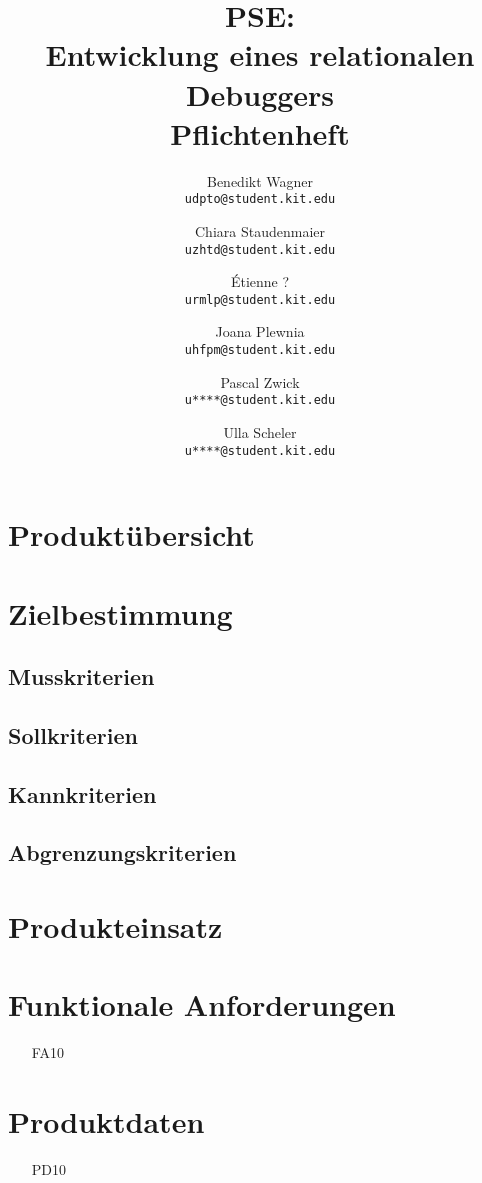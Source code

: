 \documentclass[parskip=full]{scrartcl}
\title{PSE:\\ Entwicklung eines relationalen Debuggers\\ Pflichtenheft}
\author{
	Benedikt Wagner\\
	\texttt{udpto@student.kit.edu}
	\and Chiara Staudenmaier\\
	\texttt{uzhtd@student.kit.edu}
	\and Étienne ?\\
	\texttt{urmlp@student.kit.edu}
	\and Joana Plewnia\\
	\texttt{uhfpm@student.kit.edu} 
	\and Pascal Zwick\\
	\texttt{u****@student.kit.edu}
	\and Ulla Scheler\\
	\texttt{u****@student.kit.edu}
}
\begin{document}
\maketitle

\section{Produktübersicht}

\section{Zielbestimmung}
\subsection{Musskriterien}
\subsection{Sollkriterien}
\subsection{Kannkriterien}
\subsection{Abgrenzungskriterien}

\section{Produkteinsatz}

\section{Funktionale Anforderungen}
\begin{itemize}[nosep]
\item[FA10] %
\end{itemize}

\section{Produktdaten}
\begin{itemize}[nosep]
\item[PD10] %
\end{itemize}
\end{document}
